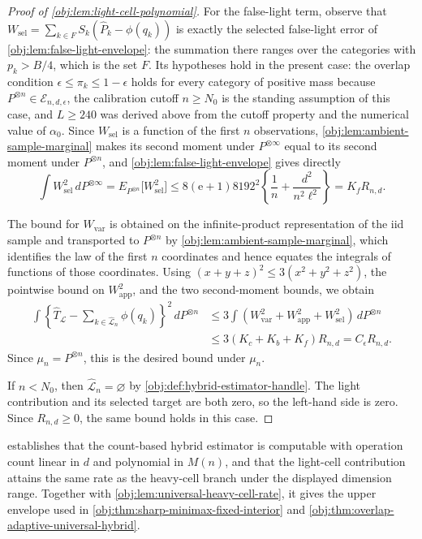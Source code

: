 \documentclass[11pt]{article}
\begin{document}
\begin{proof}[Proof of \cref{obj:lem:light-cell-polynomial}]
For the false-light term, observe that
\(W_{\mathrm{sel}}=\sum_{k\in F}S_k(\widehat P_k-\phi(q_k))\)
is exactly the selected false-light error of \cref{obj:lem:false-light-envelope}: the summation there ranges over the categories with \(p_k>B/4\), which is the set \(F\).  Its hypotheses hold in the present case: the overlap condition \(\epsilon\le\pi_k\le1-\epsilon\) holds for every category of positive mass because \(P^{\otimes n}\in\mathcal E_{n,d,\epsilon}\), the calibration cutoff \(n\ge N_0\) is the standing assumption of this case, and \(L\ge240\) was derived above from the cutoff property and the numerical value of \(\alpha_0\).  Since \(W_{\mathrm{sel}}\) is a function of the first \(n\) observations, \cref{obj:lem:ambient-sample-marginal} makes its second moment under \(P^{\otimes\infty}\) equal to its second moment under \(P^{\otimes n}\), and \cref{obj:lem:false-light-envelope} gives directly
\[
\int W_{\mathrm{sel}}^2\,dP^{\otimes\infty}
=
E_{P^{\otimes n}}\bigl[W_{\mathrm{sel}}^2\bigr]
\le
8(\mathrm e+1)8192^2
\left\{\frac1n+\frac{d^2}{n^2\ell^2}\right\}
=
K_fR_{n,d}.
\] %

The bound for \(W_{\mathrm{var}}\) is obtained on the infinite-product representation of the iid sample and transported to \(P^{\otimes n}\) by \cref{obj:lem:ambient-sample-marginal}, which identifies the law of the first \(n\) coordinates and hence equates the integrals of functions of those coordinates.  Using \((x+y+z)^2\le3(x^2+y^2+z^2)\), the pointwise bound on \(W_{\mathrm{app}}^2\), and the two second-moment bounds, we obtain
\[
\begin{aligned}
\int
\left\{
\widehat T_{\mathcal L}
-
\sum_{k\in\widehat{\mathcal L}_n}\phi(q_k)
\right\}^2
\,dP^{\otimes n}
&\le
3\int(W_{\mathrm{var}}^2+W_{\mathrm{app}}^2+W_{\mathrm{sel}}^2)\,dP^{\otimes n} \\
&\le
3(K_c+K_b+K_f)R_{n,d}
=
C_\epsilon R_{n,d}.
\end{aligned}
\] %
Since \(\mu_n=P^{\otimes n}\), this is the desired bound under \(\mu_n\).

If \(n<N_0\), then \(\widehat{\mathcal L}_n=\varnothing\) by \cref{obj:def:hybrid-estimator-handle}.  The light contribution and its selected target are both zero, so the left-hand side is zero.  Since \(R_{n,d}\ge0\), the same bound holds in this case. %
\end{proof}

 establishes that the count-based hybrid estimator is computable with operation count linear in \(d\) and polynomial in \(M(n)\), and that the light-cell contribution attains the same rate as the heavy-cell branch under the displayed dimension range. Together with \cref{obj:lem:universal-heavy-cell-rate}, it gives the upper envelope used in \cref{obj:thm:sharp-minimax-fixed-interior} and \cref{obj:thm:overlap-adaptive-universal-hybrid}.
\end{document}
